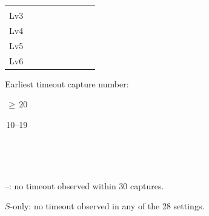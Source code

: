 \begin{table}[t]
{\begin{tabular}{@{}HPP|PP||PP|PP@{}}
  &  &
  &  \\
 Lv3 &
  &  &
  &  &
  &  &
  &  \\
 \midrule
 Lv4 &
  &  &
  &  &
  &  &
  &  \\
 Lv5 &
  &  &
  &  &
  &  &
  &  \\
 Lv6 &
  &  &
  &  &
  &  &
  &  \\
 \bottomrule
 \end{tabular}%
 }
 \par\vspace{3pt}
 {\scriptsize\begin{minipage}{0.933\columnwidth}
 \raggedright\setlength{\fboxsep}{1.8pt}%
 Earliest timeout capture number:~%
 \colorbox{tmoS1}{\strut\,${\geq}\,20$\,}%
 \colorbox{tmoS2}{\strut\,10--19\,}%
 \colorbox{tmoS3}{\strut\,\textcolor{white}{6--9}\,}%
 \colorbox{tmoS4}{\strut\,\textcolor{white}{${\leq}\,5$}\,}\par
 --: no timeout observed within 30 captures.\par
 \(S\)-only: no timeout observed in any of the 28 settings.\par
 \end{minipage}}
\end{table}